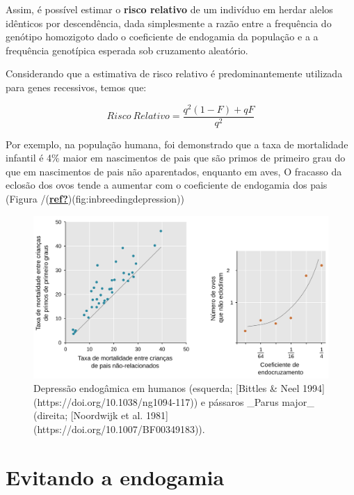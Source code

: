\documentclass[
]{book}
\begin{document}
Assim, é possível estimar o \textbf{risco relativo} de um indivíduo em herdar alelos idênticos por descendência, dada simplesmente a razão entre a frequência do genótipo homozigoto dado o coeficiente de endogamia da população e a a frequência genotípica esperada sob cruzamento aleatório.

Considerando que a estimativa de risco relativo é predominantemente utilizada para genes recessivos, temos que:

\[{Risco \ Relativo} = \frac{ q^2 \left( 1-F \right) + qF }{ q^2 }\]

Por exemplo, na população humana, foi demonstrado que a taxa de mortalidade infantil é 4\% maior em nascimentos de pais que são primos de primeiro grau do que em nascimentos de pais não aparentados, enquanto em aves, O fracasso da eclosão dos ovos tende a aumentar com o coeficiente de endogamia dos pais (Figura /(\protect\hyperlink{ref-ref}{\textbf{ref?}})(fig:inbreedingdepression))

\begin{figure}

{\centering \includegraphics[width=800px]{figs/inbreeding_depression} 

}

\caption{Depressão endogâmica em humanos (esquerda; [Bittles & Neel 1994](https://doi.org/10.1038/ng1094-117)) e pássaros _Parus major_ (direita; [Noordwijk et al. 1981](https://doi.org/10.1007/BF00349183)).}\label{fig:inbreedingdepression}
\end{figure}

\hypertarget{evitando-a-endogamia}{%
\section{Evitando a endogamia}\label{evitando-a-endogamia}}
\end{document}
